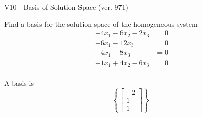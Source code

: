 \begin{exercise}
  \begin{exerciseTitle}V10 - Basis of Solution Space (ver. 971)\end{exerciseTitle}
  \begin{exerciseStatement}
    Find a basis for the solution space of the homogeneous system 
\begin{align*}
 -4 x_ 1 -6 x_ 2 -2 x_ 3 &= 0  \\ 
  -6 x_ 1 -12 x_ 3 &= 0  \\ 
  -4 x_ 1 -8 x_ 3 &= 0  \\ 
  -1 x_ 1 + 4 x_ 2 -6 x_ 3 &= 0  \\ 
 \end{align*}


 
  \end{exerciseStatement}

  \begin{exerciseAnswer}
   A basis is   
\[\left\{\left[\begin{array}{c}
-2 \\
1 \\
1
\end{array}\right]\right\}.\]

  


  \end{exerciseAnswer}
\end{exercise}